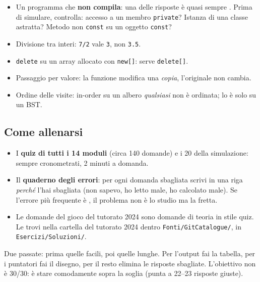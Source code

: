 \begin{trappola}
\begin{itemize}
  \item Un programma che \textbf{non compila}: una delle risposte è quasi sempre
        . Prima di simulare, controlla: accesso a un membro
        \texttt{private}? Istanza di una classe astratta? Metodo non \texttt{const} su un
        oggetto \texttt{const}?
  \item Divisione tra interi: \texttt{7/2} vale \texttt{3}, non \texttt{3.5}.
  \item \texttt{delete} su un array allocato con \texttt{new[]}: serve \texttt{delete[]}.
  \item Passaggio per valore: la funzione modifica una \emph{copia}, l'originale non
        cambia.
  \item Ordine delle visite: in-order su un albero \emph{qualsiasi} non è ordinata; lo è
        solo su un BST.
\end{itemize}
\end{trappola}

\subsection*{Come allenarsi}

\begin{itemize}
  \item I \textbf{quiz di tutti i 14 moduli} (circa 140 domande) e i 20 della simulazione:
        sempre cronometrati, 2 minuti a domanda.
  \item Il \textbf{quaderno degli errori}: per ogni domanda sbagliata scrivi in una riga
        \emph{perché} l'hai sbagliata (non sapevo, ho letto male, ho calcolato male).
        Se l'errore più frequente è , il problema non è lo studio ma la
        fretta.
  \item Le domande del gioco  del tutorato 2024 sono
        domande di teoria in stile quiz. Le trovi nella cartella del tutorato 2024 dentro
        \texttt{Fonti/GitCatalogue/}, in \texttt{Esercizi/Soluzioni/}.
\end{itemize}

\begin{inparole}
Due passate: prima quelle facili, poi quelle lunghe. Per l'output fai la tabella, per i
puntatori fai il disegno, per il resto elimina le risposte sbagliate. L'obiettivo non è
30/30: è stare comodamente sopra la soglia (punta a 22--23 risposte giuste).
\end{inparole}

